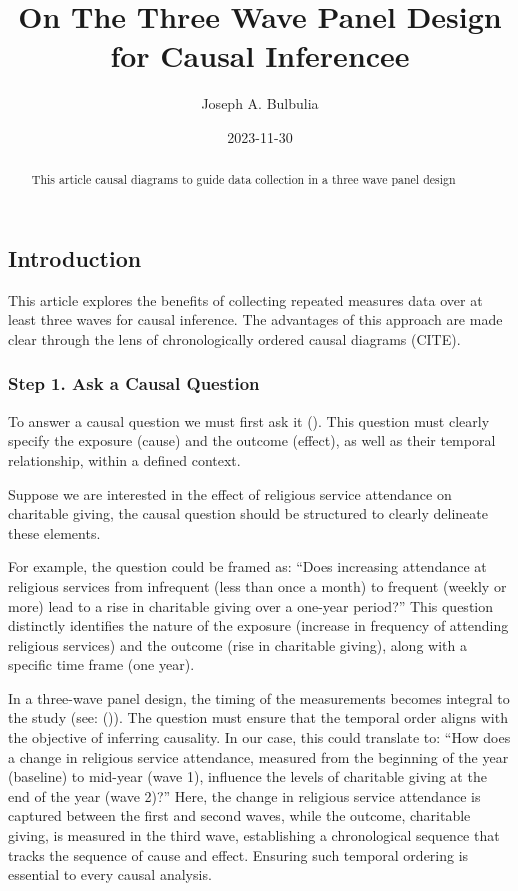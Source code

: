 \documentclass[
  singlecolumn,
  9pt]{article}
\title{On The Three Wave Panel Design for Causal Inferencee}
\author{Joseph A. Bulbulia}
\affil{%
                  Victoria University of Wellington, New Zealand, School
                  of Psychology, Centre for Applied Cross-Cultural
                  Research
              }
\date{2023-11-30}
\begin{document}
\maketitle
\begin{abstract}
This article causal diagrams to guide data collection in a three wave
panel design
\end{abstract}
\subsection{Introduction}\label{introduction}

This article explores the benefits of collecting repeated measures data
over at least three waves for causal inference. The advantages of this
approach are made clear through the lens of chronologically ordered
causal diagrams (CITE).

\subsubsection{Step 1. Ask a Causal
Question}\label{step-1.-ask-a-causal-question}

To answer a causal question we must first ask it
(). This question
must clearly specify the exposure (cause) and the outcome (effect), as
well as their temporal relationship, within a defined context.

Suppose we are interested in the effect of religious service attendance
on charitable giving, the causal question should be structured to
clearly delineate these elements.

For example, the question could be framed as: ``Does increasing
attendance at religious services from infrequent (less than once a
month) to frequent (weekly or more) lead to a rise in charitable giving
over a one-year period?'' This question distinctly identifies the nature
of the exposure (increase in frequency of attending religious services)
and the outcome (rise in charitable giving), along with a specific time
frame (one year).

In a three-wave panel design, the timing of the measurements becomes
integral to the study (see: ()). The question must ensure that the temporal order
aligns with the objective of inferring causality. In our case, this
could translate to: ``How does a change in religious service attendance,
measured from the beginning of the year (baseline) to mid-year (wave 1),
influence the levels of charitable giving at the end of the year (wave
2)?'' Here, the change in religious service attendance is captured
between the first and second waves, while the outcome, charitable
giving, is measured in the third wave, establishing a chronological
sequence that tracks the sequence of cause and effect. Ensuring such
temporal ordering is essential to every causal analysis.
\end{document}
